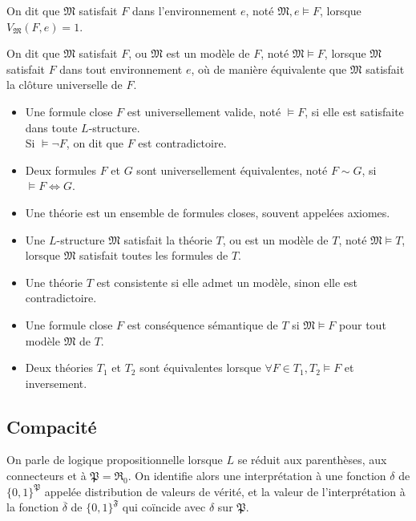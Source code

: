 \documentclass[a4paper]{article}
\begin{document}
\begin{definition}
  On dit que $\mathfrak{M}$ satisfait $F$ dans l'environnement $e$, noté $\mathfrak{M},e \models F$, lorsque $V_{\mathfrak{M}}(F,e) = 1$.

  On dit que $\mathfrak{M}$ satisfait $F$, ou $\mathfrak{M}$ est un modèle de $F$, noté $\mathfrak{M} \models F$, lorsque $\mathfrak{M}$ satisfait $F$ dans tout environnement $e$, où de manière équivalente que $\mathfrak{M}$ satisfait la clôture universelle de $F$.
\end{definition}

\begin{definition}\mbox{}
  \begin{itemize}
  \item Une formule close $F$ est universellement valide, noté $\models F$, si elle est satisfaite dans toute $L$-structure.\\
    Si $\models\neg F$, on dit que $F$ est contradictoire.
  \item Deux formules $F$ et $G$ sont universellement équivalentes, noté $F \sim G$, si $\models F \Leftrightarrow G$.
  \item Une théorie est un ensemble de formules closes, souvent appelées axiomes.
  \item Une $L$-structure $\mathfrak{M}$ satisfait la théorie $T$, ou est un modèle de $T$, noté $\mathfrak{M} \models T$, lorsque $\mathfrak{M}$ satisfait toutes les formules de $T$.
  \item Une théorie $T$ est consistente si elle admet un modèle, sinon elle est contradictoire.
  \item Une formule close $F$ est conséquence sémantique de $T$ si $\mathfrak{M} \models F$ pour tout modèle $\mathfrak{M}$ de $T$.
  \item Deux théories $T_1$ et $T_2$ sont équivalentes lorsque $\forall F \in T_1, T_2 \models F$ et inversement.
  \end{itemize}
\end{definition}

\subsection{Compacité}

On parle de logique propositionnelle lorsque $L$ se réduit aux parenthèses, aux connecteurs et à $\mathfrak{P} = \mathfrak{R}_0$. On identifie alors une interprétation à une fonction $\delta$ de $\{0,1\}^{\mathfrak{P}}$ appelée distribution de valeurs de vérité, et la valeur de l'interprétation à la fonction $\overline{\delta}$ de $\{0,1\}^{\mathfrak{F}}$ qui coïncide avec $\delta$ sur $\mathfrak{P}$.
\end{document}
